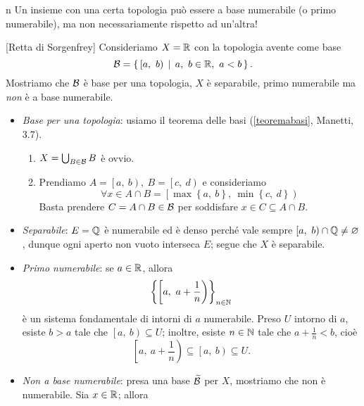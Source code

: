 \begin{warning}{n}
Un insieme con una certa topologia può essere a base numerabile (o primo numerabile), ma non necessariamente rispetto ad un'altra!
\end{warning}
\begin{example}{}[Retta di Sorgenfrey]
Consideriamo $X=\mathbb{R}$ con la topologia avente come base
\begin{equation*}
\basis=\Set{\left[a,\ b\right)| a,\ b\in\R,\ a<b}.
\end{equation*}
Mostriamo che $\mathcal{B}$ è base per una topologia, $X$ è separabile, primo numerabile ma \textit{non} è a base numerabile.
\begin{itemize}
	\item \textit{Base per una topologia}: usiamo il teorema delle basi (\ref{teoremabasi}, Manetti, 3.7).
	\begin{enumerate}[label=\Roman*]
		\item $X=\bigcup_{B\in \mathcal{B}}B$ è ovvio.
		\item Prendiamo $A=\left[a,\ b\right),\ B=\left[c,\ d\right)$ e consideriamo
		\begin{equation*}
			\forall x\in A\cap B=\left[\max\left\{a,\ b\right\},\ \min\left\{c,\ d\right\}\right)
		\end{equation*}
	Basta prendere $C=A\cap B\in\mathcal{B}$ per soddisfare $x\in C\subseteq A\cap B$.
	\end{enumerate}
\item \textit{Separabile}: $E=\mathbb{Q}$ è numerabile ed è denso perché vale sempre $\left[a,\ b\right)\cap \mathbb{Q} \neq \varnothing$, dunque ogni aperto non vuoto interseca $E$; segue che $X$ è separabile.
\item \textit{Primo numerabile}: se $a\in\mathbb{R}$, allora
\begin{equation*}
	\left\{\left[a,\ a+\frac{1}{n}\right)\right\}_{n\in\N}
\end{equation*}
è un sistema fondamentale di intorni di $a$ numerabile. Preso $U$ intorno di $a$, esiste $b>a$ tale che $\left[a,\ b\right)\subseteq U$; inoltre, esiste $n\in\mathbb{N}$ tale che $a+\frac{1}{n}<b$, cioè
\begin{equation*}
\left[a,\ a+\frac{1}{n}\right)\subseteq\left[a,\ b\right)\subseteq U.
\end{equation*}
\item \textit{Non a base numerabile}: presa una base $\widetilde{\mathcal{B}}$ per $X$, mostriamo che non è numerabile. Sia $x\in\mathbb{R}$; allora
\begin{equation*}

\end{equation*}
\end{itemize}
\end{example}
